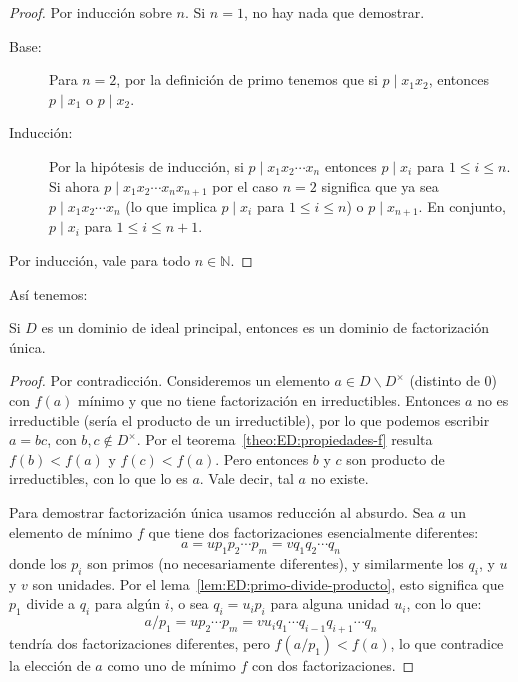   \begin{proof}
    Por inducción sobre \(n\).
    Si \(n = 1\),
    no hay nada que demostrar.
    \begin{description}
    \item[Base:]
      Para \(n = 2\),
      por la definición de primo tenemos que si \(p \mid x_1 x_2\),
      entonces \(p \mid x_1\) o \(p \mid x_2\).
    \item[Inducción:]
      Por la hipótesis de inducción,
      si \(p \mid x_1 x_2 \dotsm x_n\)
      entonces \(p \mid x_i\) para \(1 \le i \le n\).
      Si ahora \(p \mid x_1 x_2 \dotsm x_n x_{n + 1}\)
      por el caso \(n = 2\) significa que ya sea
      \(p \mid x_1 x_2 \dotsm x_n\)
      (lo que implica \(p \mid x_i\) para \(1 \le i \le n\))
      o \(p \mid x_{n + 1}\).
      En conjunto,
      \(p \mid x_i\) para \(1 \le i \le n + 1\).
    \end{description}
    Por inducción,
    vale para todo \(n \in \mathbb{N}\).
  \end{proof}
  Así tenemos:
  \begin{theorem}
    \label{theo:PID=>UFD}
    Si \(D\) es un dominio de ideal principal,
    entonces es un dominio de factorización única.
  \end{theorem}
  \begin{proof}
    Por contradicción.
    Consideremos un elemento \(a \in D \smallsetminus D^\times\)
    (distinto de \(0\))
    con \(f(a)\) mínimo
    y que no tiene factorización en irreductibles.
    Entonces \(a\) no es irreductible
    (sería el producto de un irreductible),
    por lo que podemos escribir \(a = b c\),
    con \(b, c \notin D^\times\).
    Por el teorema~\ref{theo:ED:propiedades-f}
    resulta \(f(b) < f(a)\) y \(f(c) < f(a)\).
    Pero entonces \(b\) y \(c\) son producto de irreductibles,
    con lo que lo es \(a\).
    Vale decir,
    tal \(a\) no existe.

    Para demostrar factorización única usamos reducción al absurdo.
    Sea \(a\) un elemento de mínimo \(f\)
    que tiene dos factorizaciones esencialmente diferentes:
    \begin{equation*}
      a
	= u p_1 p_2 \dotsm p_m
	= v q_1 q_2 \dotsm q_n
    \end{equation*}
    donde los \(p_i\) son primos
    (no necesariamente diferentes),
    y similarmente los \(q_i\),
    y \(u\) y \(v\) son unidades.
    Por el lema~\ref{lem:ED:primo-divide-producto},
    esto significa que \(p_1\) divide a \(q_i\) para algún \(i\),
    o sea \(q_i = u_i p_i\) para alguna unidad \(u_i\),
    con lo que:
    \begin{equation*}
      a / p_1
	= u p_2 \dotsm p_m
	= v u_i q_1 \dotsm q_{i -1} q_{i + 1} \dotsm q_n
    \end{equation*}
    tendría dos factorizaciones diferentes,
    pero \(f(a / p_1) < f(a)\),
    lo que contradice la elección de \(a\) como uno de mínimo \(f\)
    con dos factorizaciones.
  \end{proof}
